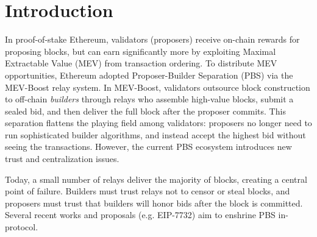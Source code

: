 \section{Introduction}
In proof-of-stake Ethereum, validators (proposers) receive on-chain rewards for proposing blocks, but can earn significantly more by exploiting Maximal Extractable Value (MEV) from transaction ordering.  To distribute MEV opportunities, Ethereum adopted Proposer-Builder Separation (PBS) via the MEV-Boost relay system.  In MEV-Boost, validators outsource block construction to off-chain \emph{builders}  through relays who assemble high-value blocks, submit a sealed bid, and then deliver the full block after the proposer commits.  This separation flattens the playing field among validators: proposers no longer need to run sophisticated builder algorithms, and instead accept the highest bid without seeing the transactions.  However, the current PBS ecosystem introduces new trust and centralization issues.

Today, a small number of relays deliver the majority of blocks, creating a central point of failure.  Builders must trust relays not to censor or steal blocks, and proposers must trust that builders will honor bids after the block is committed.  Several recent works and proposals (e.g. EIP-7732) aim to enshrine PBS in-protocol.